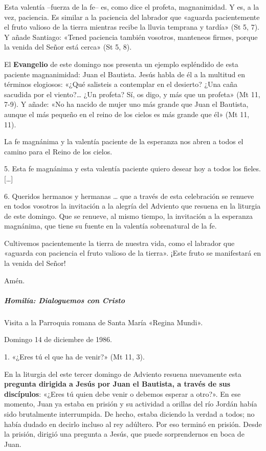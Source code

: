 \documentclass[]{article}
\let\oldsubparagraph\subparagraph
\renewcommand{\subparagraph}[1]{\oldsubparagraph{#1}\mbox{}}
\begin{document}
Esta valentía --fuerza de la fe-- es, como dice el profeta,
magnanimidad. Y es, a la vez, paciencia. Es similar a la paciencia del
labrador que «aguarda pacientemente el fruto valioso de la tierra
mientras recibe la lluvia temprana y tardía» (St 5, 7). Y añade
Santiago: «Tened paciencia también vosotros, manteneos firmes, porque la
venida del Señor está cerca» (St 5, 8).

El \textbf{Evangelio} de este domingo nos presenta un ejemplo espléndido
de esta paciente magnanimidad: Juan el Bautista. Jesús habla de él a la
multitud en términos elogiosos: «¿Qué salisteis a contemplar en el
desierto? ¿Una caña sacudida por el viento?\ldots{} ¿Un profeta? Sí, os
digo, y más que un profeta» (Mt 11, 7-9). Y añade: «No ha nacido de
mujer uno más grande que Juan el Bautista, aunque el más pequeño en el
reino de los cielos es más grande que él» (Mt 11, 11).

La fe magnánima y la valentía paciente de la esperanza nos abren a todos
el camino para el Reino de los cielos.

5. Esta fe magnánima y esta valentía paciente quiero desear hoy a todos
los fieles. {[}\ldots{}{]}

6. Queridos hermanos y hermanas \ldots{} que a través de esta
celebración se renueve en todos vosotros la invitación a la alegría del
Adviento que resuena en la liturgia de este domingo. Que se renueve, al
mismo tiempo, la invitación a la esperanza magnánima, que tiene su
fuente en la valentía sobrenatural de la fe.

Cultivemos pacientemente la tierra de nuestra vida, como el labrador que
«aguarda con paciencia el fruto valioso de la tierra». ¡Este fruto se
manifestará en la venida del Señor!

Amén.

\subparagraph{Homilía: Dialoguemos con
Cristo}\label{homiluxeda-dialoguemos-con-cristo}

Visita a la Parroquia romana de Santa María «Regina Mundi».

Domingo 14 de diciembre de 1986.

1. «¿Eres tú el que ha de venir?» (Mt 11, 3).

En la liturgia del este tercer domingo de Adviento resuena nuevamente
esta \textbf{pregunta dirigida a Jesús por Juan el Bautista, a través de
sus discípulos}: «¿Eres tú quien debe venir o debemos esperar a otro?».
En ese momento, Juan ya estaba en prisión y su actividad a orillas del
río Jordán había sido brutalmente interrumpida. De hecho, estaba
diciendo la verdad a todos; no había dudado en decirlo incluso al rey
adúltero. Por eso terminó en prisión. Desde la prisión, dirigió una
pregunta a Jesús, que puede sorprendernos en boca de Juan.
\end{document}

